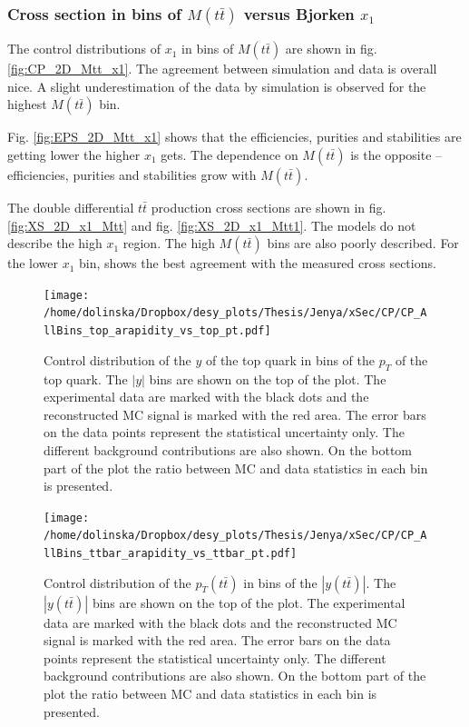 \subsubsection{Cross section in bins of $M(t\bar{t})$ versus Bjorken $x_{1}$}

The control distributions of $x_{1}$ in bins of $M(t\bar{t})$ are shown in fig. \ref{fig:CP_2D_Mtt_x1}. The agreement between simulation and data is overall nice.
A slight underestimation of the data by simulation is observed for the highest $M(t\bar{t})$ bin.

Fig. \ref{fig:EPS_2D_Mtt_x1} shows that the efficiencies, purities and stabilities are getting lower the higher $x_{1}$ gets. The dependence on $M(t\bar{t})$
is the opposite -- efficiencies, purities and stabilities grow with $M(t\bar{t})$.

The double differential $t\bar{t}$ production cross sections are shown in fig. \ref{fig:XS_2D_x1_Mtt} and fig. \ref{fig:XS_2D_x1_Mtt1}. The models do not describe the high $x_{1}$ region. The 
high $M(t\bar{t})$ bins are also poorly described. For the lower $x_{1}$ bin, \MG shows the best agreement with the measured cross sections.



\begin{figure}[p]
  \centering
  \texttt{[image: /home/dolinska/Dropbox/desy\_plots/Thesis/Jenya/xSec/CP/CP\_AllBins\_top\_arapidity\_vs\_top\_pt.pdf]}
  \caption{Control distribution of the $y$ of the top quark in bins of the $p_{T}$ of the top quark. The $|y|$ bins are shown on the top 
  of the plot. The experimental data are marked with the black dots and the reconstructed MC signal is marked with the red area. The error
  bars on the data points represent the statistical uncertainty only. The 
  different background contributions are also shown. On the bottom part of the plot the ratio between MC and data statistics in each bin
  is presented.}
  \label{fig:CP_2D_y_pt}
\end{figure}

\begin{figure}[p]
  \centering
  \texttt{[image: /home/dolinska/Dropbox/desy\_plots/Thesis/Jenya/xSec/CP/CP\_AllBins\_ttbar\_arapidity\_vs\_ttbar\_pt.pdf]}
  \caption{Control distribution of the $p_{T}(t\bar{t})$ in bins of the $|y(t\bar{t})|$. The $|y(t\bar{t})|$ bins are shown on the top 
  of the plot. The experimental data are marked with the black dots and the reconstructed MC signal is marked with the red area. The error
  bars on the data points represent the statistical uncertainty only. The 
  different background contributions are also shown. On the bottom part of the plot the ratio between MC and data statistics in each bin
  is presented.}
  \label{fig:CP_2D_pttt_ytt}
\end{figure}

